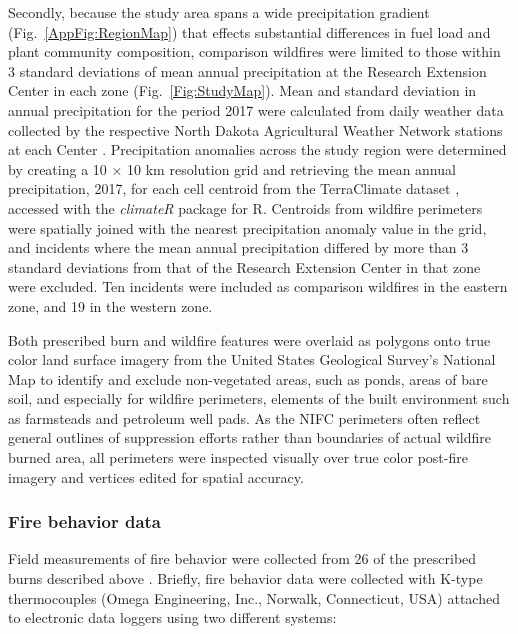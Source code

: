 \documentclass[fire,article,submit,oneauthor,pdftex]{Definitions/mdpi}
\begin{document}
Secondly, because the study area spans a wide precipitation gradient (Fig.~\ref{AppFig:RegionMap}) that effects substantial differences in fuel load and plant community composition, comparison wildfires were limited to those within 3 standard deviations of mean annual precipitation at the Research Extension Center in each zone (Fig.~\ref{Fig:StudyMap}).
Mean and standard deviation in annual precipitation for the period 2017 were calculated from daily weather data collected by the respective North Dakota Agricultural Weather Network stations at each Center \cite{ndawn2025, ndawn2025a}. 
Precipitation anomalies across the study region were determined by creating a 10 $\times$ 10 km resolution grid and retrieving the mean annual precipitation, 2017, for each cell centroid from the TerraClimate dataset \cite{abatzoglou2018}, accessed with the \emph{climateR} package \cite{johnson2021} for \textsf{R}. 
Centroids from wildfire perimeters were spatially joined with the nearest precipitation anomaly value in the grid, and incidents where the mean annual precipitation differed  by more than 3 standard deviations from that of the Research Extension Center in that zone were excluded.
Ten incidents were included as comparison wildfires in the eastern zone, and 19 in the western zone. 

Both prescribed burn and wildfire features were overlaid as polygons onto true color land surface imagery from the United States Geological Survey's National Map \cite{usgs_nm} to identify and exclude non-vegetated areas, such as ponds, areas of bare soil, and especially for wildfire perimeters, elements of the built environment such as farmsteads and petroleum well pads. 
As the NIFC perimeters often reflect general outlines of suppression efforts rather than boundaries of actual wildfire burned area, all perimeters were inspected visually over true color post-fire imagery and vertices edited for spatial accuracy.  

\subsubsection{Fire behavior data}

Field measurements of fire behavior were collected from 26 of the prescribed burns described above \cite{mcgranahan2022,mcgranahan2023}.
Briefly, fire behavior data were collected with K-type thermocouples (Omega Engineering, Inc., Norwalk, Connecticut, USA) attached to electronic data loggers using two different systems: 
\end{document}
